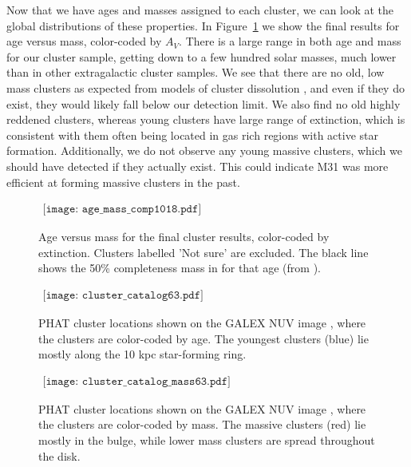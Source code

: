 \documentclass{emulateapj}
\begin{document}
Now that we have ages and masses assigned to each cluster, we can look at the global distributions of these properties.  In Figure~\ref{fig:age_mass} we show the final results for age versus mass, color-coded by $A_{V}$.  There is a large range in both age and mass for our cluster sample, getting down to a few hundred solar masses, much lower than in other extragalactic cluster samples.  We see that there are no old, low mass clusters as expected from models of cluster dissolution \citep[e.g.,][] {Bastian06}, and even if they do exist, they would likely fall below our detection limit.  We also find no old highly reddened clusters, whereas young clusters have large range of extinction, which is consistent with them often being located in gas rich regions with active star formation.  Additionally, we do not observe any young massive clusters, which we should have detected if they actually exist.  This could indicate M31 was more efficient at forming massive clusters in the past.


\begin{figure}[!ht]
   \begin{center}$
      \begin{array}{cc}
         \texttt{[image: age\_mass\_comp1018.pdf]} 
      \end{array}$
   \end{center}
  \caption{Age versus mass for the final cluster results, color-coded by extinction.  Clusters labelled 'Not sure' are excluded.  The black line shows the 50\% completeness mass in for that age (from \citep{Johnson15}).}
  \label{fig:age_mass}
\end{figure}


\begin{figure}[ht!]
   \begin{center}$
      \begin{array}{cc}
         \texttt{[image: cluster\_catalog63.pdf]} 
      \end{array}$
   \end{center}
  \caption{PHAT cluster locations shown on the GALEX NUV image \citep{Thilker05}, where the clusters are color-coded by age.  The youngest clusters (blue) lie mostly along the 10 kpc star-forming ring.}
  \label{fig:age_catalog}
\end{figure}


\begin{figure}[ht!]
   \begin{center}$
      \begin{array}{cc}
         \texttt{[image: cluster\_catalog\_mass63.pdf]} 
      \end{array}$
   \end{center}
  \caption{PHAT cluster locations shown on the GALEX NUV image \citep{Thilker05}, where the clusters are color-coded by mass.  The massive clusters (red) lie mostly in the bulge, while lower mass clusters are spread throughout the disk.}
  \label{fig:mass_catalog}
\end{figure}
\end{document}
